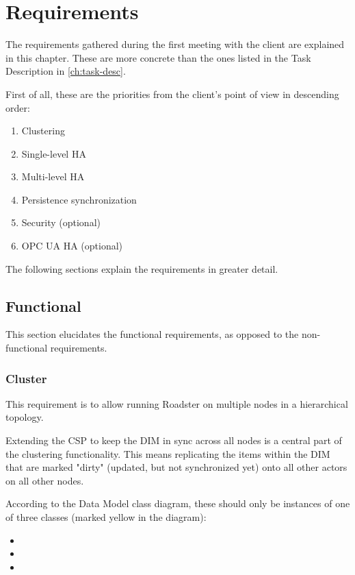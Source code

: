 \chapter{Requirements}
The requirements gathered during the first meeting with the client are
explained in this chapter. These are more concrete than the ones listed in the
Task Description in \autoref{ch:task-desc}.

First of all, these are the priorities from the client's point of view in
descending order:

\begin{enumerate}
\item Clustering
\item Single-level \gls{HA}
\item Multi-level \gls{HA}
\item Persistence synchronization
\item Security (optional)
\item OPC UA \gls{HA} (optional)
\end{enumerate}

The following sections explain the requirements in greater detail.

\section{Functional}
This section elucidates the functional requirements, as opposed to the
non-functional requirements.

\subsection{Cluster}
This requirement is to allow running Roadster on multiple nodes in a
hierarchical topology.

Extending the \gls{CSP} to keep the \gls{DIM} in sync across all nodes is a central
part of the clustering functionality. This means replicating the
items within the DIM that are marked "dirty" (updated, but not synchronized yet) onto all other actors on all other nodes.

According to
the Data Model class diagram, these should only be instances of one of three
classes (marked yellow in the diagram):
\begin{itemize}
	\item {}
	\item {}
	\item {}
\end{itemize}

